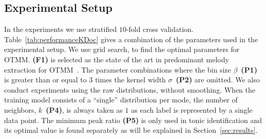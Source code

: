 \documentclass{sig-alternate}
\begin{document}
\subsection{Experimental Setup}\label{sec:experiment_setup}
In the experiments we use stratified $10$-fold cross validation. Table~\ref{tab:performanceKDoc} gives a combination of the parameters used in the experimental setup. We use grid search, to find the optimal parameters for OTMM. {\bf (F1)} is selected as the state of the art in predominant melody extraction for OTMM~\cite{atli2014makamFeature_atmm}. The parameter combinations where the bin size $\beta$~\textbf{(P1)} is greater than or equal to $3$ times the kernel width $\sigma$~\textbf{(P2)} are omitted. We also conduct experiments using the raw distributions, without smoothing. When the training model consists of a ``single'' distribution per mode, the number of neighbors, $k$~\textbf{(P4)}, is always taken as $1$ as each label is represented by a single data point. The minimum peak ratio {\bf (P5)} is only used in tonic identification and its optimal value is found separately as will be explained in Section~\ref{sec:results}.
\end{document}
